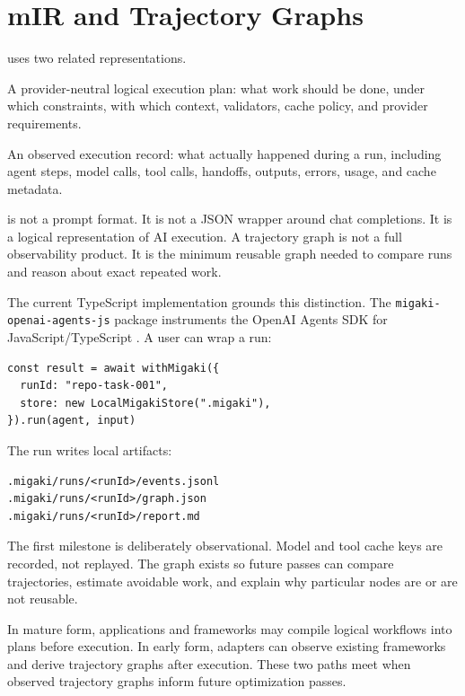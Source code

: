\section{mIR and Trajectory Graphs}

\migaki{} uses two related representations.

\begin{description}[leftmargin=1.5em]
  \item[\mir{} plan.] A provider-neutral logical execution plan: what work should be done, under which constraints, with which context, validators, cache policy, and provider requirements.
  \item[Trajectory graph.] An observed execution record: what actually happened during a run, including agent steps, model calls, tool calls, handoffs, outputs, errors, usage, and cache metadata.
\end{description}

\mir{} is not a prompt format. It is not a JSON wrapper around chat completions. It is a logical representation of AI execution. A trajectory graph is not a full observability product. It is the minimum reusable graph needed to compare runs and reason about exact repeated work.

The current \migaki{} TypeScript implementation grounds this distinction. The \texttt{migaki-openai-agents-js} package instruments the OpenAI Agents SDK for JavaScript/TypeScript \citep{openai_agents_js,migaki_openai_agents_js}. A user can wrap a run:

\begin{lstlisting}[language={}]
const result = await withMigaki({
  runId: "repo-task-001",
  store: new LocalMigakiStore(".migaki"),
}).run(agent, input)
\end{lstlisting}

The run writes local artifacts:

\begin{lstlisting}[language={}]
.migaki/runs/<runId>/events.jsonl
.migaki/runs/<runId>/graph.json
.migaki/runs/<runId>/report.md
\end{lstlisting}

The first milestone is deliberately observational. Model and tool cache keys are recorded, not replayed. The graph exists so future passes can compare trajectories, estimate avoidable work, and explain why particular nodes are or are not reusable.

In mature form, applications and frameworks may compile logical workflows into \mir{} plans before execution. In early form, adapters can observe existing frameworks and derive trajectory graphs after execution. These two paths meet when observed trajectory graphs inform future \mir{} optimization passes.
